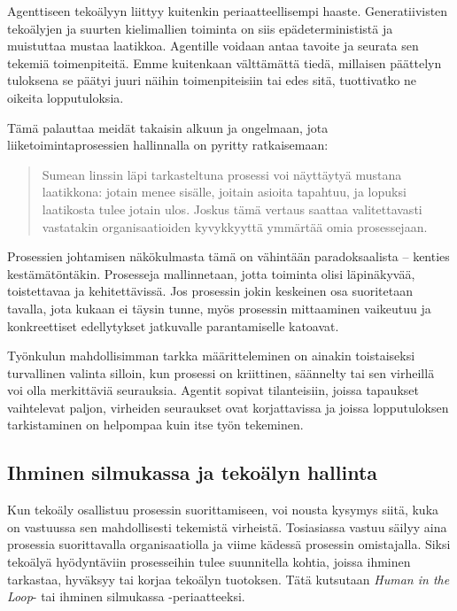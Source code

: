 \documentclass[
  finnish,
  letterpaper,
  DIV=11,
  numbers=noendperiod,
  oneside]{scrreprt}
\begin{document}
Agenttiseen tekoälyyn liittyy kuitenkin periaatteellisempi haaste.
Generatiivisten tekoälyjen ja suurten kielimallien toiminta on siis
epädeterminististä ja muistuttaa mustaa laatikkoa. Agentille voidaan
antaa tavoite ja seurata sen tekemiä toimenpiteitä. Emme kuitenkaan
välttämättä tiedä, millaisen päättelyn tuloksena se päätyi juuri näihin
toimenpiteisiin tai edes sitä, tuottivatko ne oikeita lopputuloksia.

Tämä palauttaa meidät takaisin alkuun ja ongelmaan, jota
liiketoimintaprosessien hallinnalla on pyritty ratkaisemaan:

\begin{quote}
Sumean linssin läpi tarkasteltuna prosessi voi näyttäytyä mustana
laatikkona: jotain menee sisälle, joitain asioita tapahtuu, ja lopuksi
laatikosta tulee jotain ulos. Joskus tämä vertaus saattaa valitettavasti
vastatakin organisaatioiden kyvykkyyttä ymmärtää omia prosessejaan.
\end{quote}

Prosessien johtamisen näkökulmasta tämä on vähintään paradoksaalista --
kenties kestämätöntäkin. Prosesseja mallinnetaan, jotta toiminta olisi
läpinäkyvää, toistettavaa ja kehitettävissä. Jos prosessin jokin
keskeinen osa suoritetaan tavalla, jota kukaan ei täysin tunne, myös
prosessin mittaaminen vaikeutuu ja konkreettiset edellytykset jatkuvalle
parantamiselle katoavat.

Työnkulun mahdollisimman tarkka määritteleminen on ainakin toistaiseksi
turvallinen valinta silloin, kun prosessi on kriittinen, säännelty tai
sen virheillä voi olla merkittäviä seurauksia. Agentit sopivat
tilanteisiin, joissa tapaukset vaihtelevat paljon, virheiden seuraukset
ovat korjattavissa ja joissa lopputuloksen tarkistaminen on helpompaa
kuin itse työn tekeminen.

\subsection{Ihminen silmukassa ja tekoälyn
hallinta}\label{ihminen-silmukassa-ja-tekouxe4lyn-hallinta}

Kun tekoäly osallistuu prosessin suorittamiseen, voi nousta kysymys
siitä, kuka on vastuussa sen mahdollisesti tekemistä virheistä.
Tosiasiassa vastuu säilyy aina prosessia suorittavalla organisaatiolla
ja viime kädessä prosessin omistajalla. Siksi tekoälyä hyödyntäviin
prosesseihin tulee suunnitella kohtia, joissa ihminen tarkastaa,
hyväksyy tai korjaa tekoälyn tuotoksen. Tätä kutsutaan \emph{Human in
the Loop}- tai ihminen silmukassa -periaatteeksi.
\end{document}
